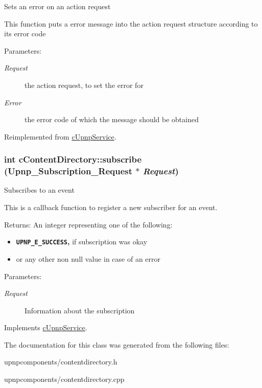 Sets an error on an action request

This function puts a error message into the action request structure according to its error code

\begin{Desc}
\item[Parameters:]
\begin{description}
\item[{\em Request}]the action request, to set the error for \item[{\em Error}]the error code of which the message should be obtained \end{description}
\end{Desc}
 

Reimplemented from \hyperlink{classcUpnpService_f0976057350505eca781aafcaf6b1d14}{cUpnpService}.\hypertarget{classcContentDirectory_17acd376a722e6e7de9ec0d4cabb707b}{
\subsubsection[{subscribe}]{\setlength{\rightskip}{0pt plus 5cm}int cContentDirectory::subscribe (Upnp\_\-Subscription\_\-Request $\ast$ {\em Request})}}
\label{classcContentDirectory_17acd376a722e6e7de9ec0d4cabb707b}


Subscribes to an event

This is a callback function to register a new subscriber for an event.

\begin{Desc}
\item[Returns:]An integer representing one of the following:\begin{itemize}
\item {\bf {\tt UPNP\_\-E\_\-SUCCESS},} if subscription was okay\item or any other non null value in case of an error\end{itemize}
\end{Desc}
\begin{Desc}
\item[Parameters:]
\begin{description}
\item[{\em Request}]Information about the subscription \end{description}
\end{Desc}
 

Implements \hyperlink{classcUpnpService_e6d3522d580e5975f5a38d5bea88e29d}{cUpnpService}.

The documentation for this class was generated from the following files:\begin{CompactItemize}
\item 
upnpcomponents/contentdirectory.h\item 
upnpcomponents/contentdirectory.cpp\end{CompactItemize}
